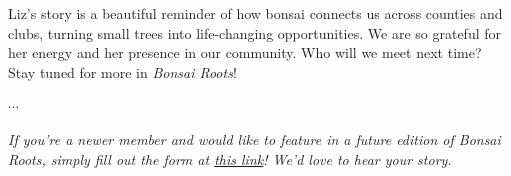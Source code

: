 Liz's story is a beautiful reminder of how bonsai connects us across counties and clubs, turning small trees into life\--changing opportunities.
We are so grateful for her energy and her presence in our community.
Who will we meet next time?
Stay tuned for more in \emph{Bonsai Roots}!

\begin{center}
            $\cdots$
\end{center}

\noindent \emph{If you're a newer member and would like to feature in a future edition of Bonsai Roots, simply fill out the form at \href{https://forms.gle/quVXa4L8rhpnT5kr6}{this link}! We'd love to hear your story.}

\closearticle
\columnbreak
